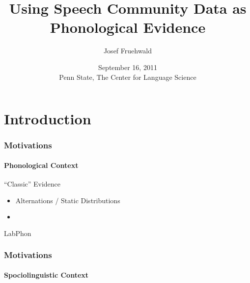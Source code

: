 \documentclass[]{beamer}
\title{Using Speech Community Data as Phonological Evidence}
\author{Josef Fruehwald}
\institute{University of Pennsylvania}
\date{September 16, 2011\\Penn State, The Center for Language Science}
\begin{document}
\begin{frame}
	\titlepage
\end{frame}

\section{Introduction}

\begin{frame}
	\frametitle{Motivations}
	\framesubtitle{Phonological Context}
	
	\begin{block}{``Classic'' Evidence}
		\begin{itemize}
			\item Alternations / Static Distributions
			\item 
		\end{itemize}
	\end{block}
	
	\begin{block}{LabPhon}
	
	\end{block}
	
\end{frame}

\begin{frame}
	\frametitle{Motivations}
	\framesubtitle{Spociolinguistic Context}
	
	
\end{frame}




\section{}
\end{document}
